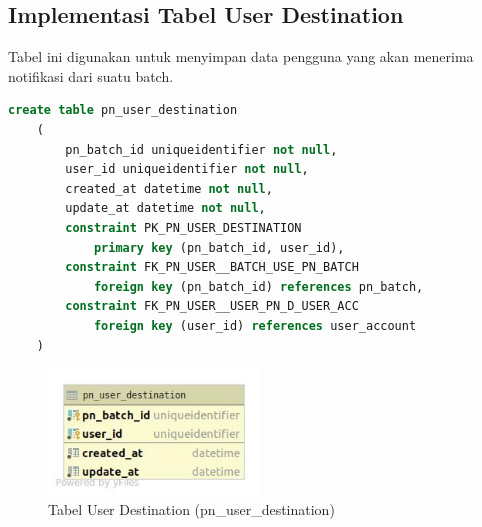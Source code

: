 \subsection{Implementasi Tabel User Destination}
\par Tabel ini digunakan untuk menyimpan data pengguna yang akan menerima notifikasi dari suatu batch.
\begin{lstlisting}[language=sql, firstnumber=1, caption=Implementasi Tabel User Destination]
    create table pn_user_destination
    (
        pn_batch_id uniqueidentifier not null,
        user_id uniqueidentifier not null,
        created_at datetime not null,
        update_at datetime not null,
        constraint PK_PN_USER_DESTINATION
            primary key (pn_batch_id, user_id),
        constraint FK_PN_USER__BATCH_USE_PN_BATCH
            foreign key (pn_batch_id) references pn_batch,
        constraint FK_PN_USER__USER_PN_D_USER_ACC
            foreign key (user_id) references user_account
    )
\end{lstlisting}
\begin{figure}[H]
    \centering\includegraphics[width=0.5\textwidth]{bab4/figures/tabel_pn_user_destination.jpg}
    \caption{Tabel User Destination (pn\_user\_destination)}
    \label{tabel_pn_user_destination}
\end{figure}

